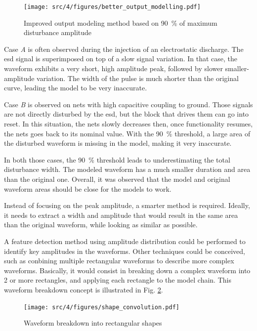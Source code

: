 \begin{figure}[!h]
  \centering
  \texttt{[image: src/4/figures/better\_output\_modelling.pdf]}
  \caption{Improved output modeling method based on \SI{90}{\percent} of maximum disturbance amplitude}
  \label{fig:impact-single-failure-criteria}
\end{figure}

Case \textit{A} is often observed during the injection of an electrostatic discharge.
The \gls{esd} signal is superimposed on top of a slow signal variation.
In that case, the waveform exhibits a very short, high amplitude peak, followed by slower smaller-amplitude variation.
The width of the pulse is much shorter than the original curve, leading the model to be very inaccurate.

Case \textit{B} is observed on nets with high capacitive coupling to ground.
Those signals are not directly disturbed by the \gls{esd}, but the block that drives them can go into reset.
In this situation, the nets slowly decreases then, once functionality resumes, the nets goes back to its nominal value.
With the \SI{90}{\percent} threshold, a large area of the disturbed waveform is missing in the model, making it very inaccurate.

In both those cases, the \SI{90}{\percent} threshold leads to underestimating the total disturbance width.
The modeled waveform has a much smaller duration and area than the original one.
Overall, it was observed that the model and original waveform areas should be close for the models to work.

Instead of focusing on the peak amplitude, a smarter method is required.
Ideally, it needs to extract a width and amplitude that would result in the same area than the original waveform, while looking as similar as possible.

A feature detection method using amplitude distribution could be performed to identify key amplitudes in the waveforms.
Other techniques could be conceived, such as conbining multiple rectangular waveforms to describe more complex waveforms.
Basically, it would consist in breaking down a complex waveform into 2 or more rectangles, and applying each rectangle to the model chain.
This waveform breakdown concept is illustrated in Fig. \ref{fig:waveform-deconvolution}.

\begin{figure}[!h]
  \centering
  \texttt{[image: src/4/figures/shape\_convolution.pdf]}
  \caption{Waveform breakdown into rectangular shapes}
  \label{fig:waveform-deconvolution}
\end{figure}

